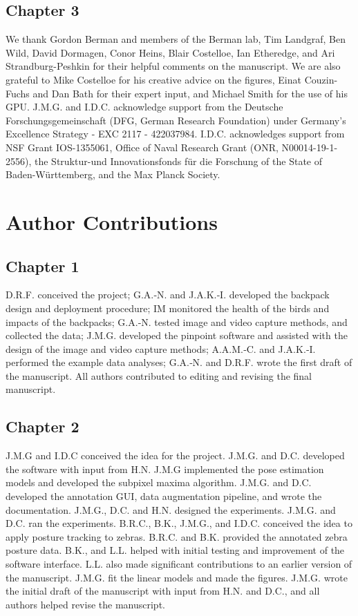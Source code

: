 \documentclass[11pt,a4paper,oneside]{book}
\begin{document}
\section*{Chapter 3}
We thank Gordon Berman and members of the Berman lab, Tim Landgraf, Ben Wild, David Dormagen, Conor Heins, Blair Costelloe, Ian Etheredge, and Ari Strandburg-Peshkin for their helpful comments on the manuscript. We are also grateful to Mike Costelloe for his creative advice on the figures, Einat Couzin-Fuchs and Dan Bath for their expert input, and Michael Smith for the use of his GPU. J.M.G. and I.D.C. acknowledge support from the Deutsche Forschungsgemeinschaft
(DFG, German Research Foundation) under Germany’s Excellence Strategy - EXC 2117 - 422037984. I.D.C. acknowledges support from NSF Grant IOS-1355061, Office of Naval Research Grant (ONR, N00014-19-1-2556), the Struktur-und Innovationsfonds f\"ur die Forschung of the State of Baden-W\"urttemberg, and the Max Planck Society.


\chapter*{Author Contributions}

\section*{Chapter 1}
D.R.F. conceived the project; G.A.‐N. and J.A.K.‐I. developed the backpack design and deployment procedure; IM monitored the health of the birds and impacts of the backpacks; G.A.‐N. tested image and video capture methods, and collected the data; J.M.G. developed the pinpoint software and assisted with the design of the image and video capture methods; A.A.M.‐C. and J.A.K.‐I. performed the example data analyses; G.A.‐N. and D.R.F. wrote the first draft of the manuscript. All authors contributed to editing and revising the final manuscript.

\section*{Chapter 2}
J.M.G and I.D.C conceived the idea for the project. J.M.G. and D.C. developed the software with input from H.N. J.M.G implemented the pose estimation models and developed the subpixel maxima algorithm. J.M.G. and D.C. developed the annotation GUI, data augmentation pipeline, and wrote the documentation. J.M.G., D.C. and H.N. designed the experiments. J.M.G. and D.C. ran the experiments. B.R.C., B.K., J.M.G., and I.D.C. conceived the idea to apply posture tracking to zebras. B.R.C. and B.K. provided the annotated zebra posture data. B.K., and L.L. helped with initial testing and improvement of the software interface. L.L. also made significant contributions to an earlier version of the manuscript. J.M.G. fit the linear models and made the figures. J.M.G. wrote the initial draft of the manuscript with input from H.N. and D.C., and all authors helped revise the manuscript.
\end{document}
